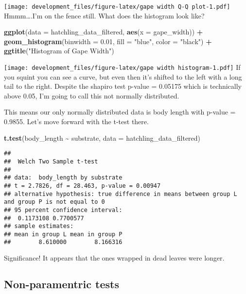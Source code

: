 \documentclass[
]{article}
\newenvironment{Shaded}{\begin{snugshade}}{\end{snugshade}}
\newcommand{\AttributeTok}[1]{\textcolor[rgb]{0.13,0.29,0.53}{#1}}
\newcommand{\FloatTok}[1]{\textcolor[rgb]{0.00,0.00,0.81}{#1}}
\newcommand{\FunctionTok}[1]{\textcolor[rgb]{0.13,0.29,0.53}{\textbf{#1}}}
\newcommand{\NormalTok}[1]{#1}
\newcommand{\SpecialCharTok}[1]{\textcolor[rgb]{0.81,0.36,0.00}{\textbf{#1}}}
\newcommand{\StringTok}[1]{\textcolor[rgb]{0.31,0.60,0.02}{#1}}
\begin{document}
\texttt{[image: development\_files/figure-latex/gape width Q-Q plot-1.pdf]}
Hmmm\ldots.I'm on the fence still. What does the histogram look like?

\begin{Shaded}
\begin{Highlighting}[]
\FunctionTok{ggplot}\NormalTok{(}\AttributeTok{data =}\NormalTok{ hatchling\_data\_filtered, }\FunctionTok{aes}\NormalTok{(}\AttributeTok{x =}\NormalTok{ gape\_width)) }\SpecialCharTok{+}
  \FunctionTok{geom\_histogram}\NormalTok{(}\AttributeTok{binwidth =} \FloatTok{0.01}\NormalTok{, }\AttributeTok{fill =} \StringTok{"blue"}\NormalTok{, }\AttributeTok{color =} \StringTok{"black"}\NormalTok{) }\SpecialCharTok{+}
  \FunctionTok{ggtitle}\NormalTok{(}\StringTok{"Histogram of Gape Width"}\NormalTok{)}
\end{Highlighting}
\end{Shaded}

\texttt{[image: development\_files/figure-latex/gape width histogram-1.pdf]}
If you squint you can see a curve, but even then it's shifted to the
left with a long tail to the right. Despite the shapiro test p-value =
0.05175 which is technically above 0.05, I'm going to call this not
normally distributed.

This means our only normally distributed data is body length with
p-value = 0.9855. Let's move forward with the t-test there.

\begin{Shaded}
\begin{Highlighting}[]
\FunctionTok{t.test}\NormalTok{(body\_length }\SpecialCharTok{\textasciitilde{}}\NormalTok{ substrate, }\AttributeTok{data =}\NormalTok{ hatchling\_data\_filtered)}
\end{Highlighting}
\end{Shaded}

\begin{verbatim}
## 
##  Welch Two Sample t-test
## 
## data:  body_length by substrate
## t = 2.7826, df = 28.463, p-value = 0.00947
## alternative hypothesis: true difference in means between group L and group P is not equal to 0
## 95 percent confidence interval:
##  0.1173108 0.7700577
## sample estimates:
## mean in group L mean in group P 
##        8.610000        8.166316
\end{verbatim}

Significance! It appears that the ones wrapped in dead leaves were
longer.

\subsection{Non-paramentric tests}\label{non-paramentric-tests}
\end{document}
